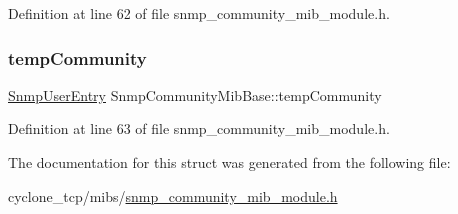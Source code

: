 Definition at line 62 of file snmp\+\_\+community\+\_\+mib\+\_\+module.\+h.

\mbox{\label{structSnmpCommunityMibBase_a1dc8d7fc590d78767ba81645320cb1e8}} 
\subsubsection{\texorpdfstring{temp\+Community}{tempCommunity}}
{\footnotesize\ttfamily \hyperlink{structSnmpUserEntry}{Snmp\+User\+Entry} Snmp\+Community\+Mib\+Base\+::temp\+Community}



Definition at line 63 of file snmp\+\_\+community\+\_\+mib\+\_\+module.\+h.



The documentation for this struct was generated from the following file\+:\begin{DoxyCompactItemize}
\item 
cyclone\+\_\+tcp/mibs/\hyperlink{snmp__community__mib__module_8h}{snmp\+\_\+community\+\_\+mib\+\_\+module.\+h}\end{DoxyCompactItemize}
